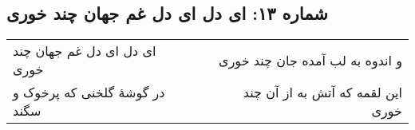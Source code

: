 \begin{center}
\section*{شماره ۱۳: ای دل ای دل غم جهان چند خوری}
\label{sec:013}
\begin{longtable}{l p{0.5cm} r}
ای دل ای دل غم جهان چند خوری
&&
و اندوه به لب آمده جان چند خوری
\\
در گوشهٔ گلخنی که پرخوک و سگند
&&
این لقمه که آتش به از آن چند خوری
\\
\end{longtable}
\end{center}
